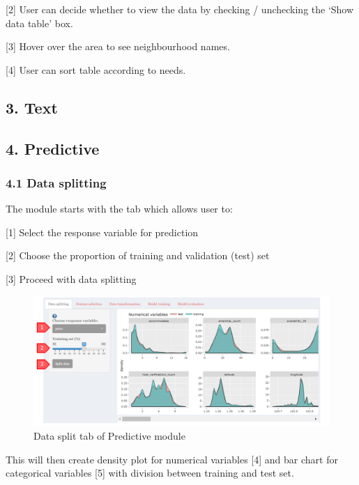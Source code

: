 \documentclass[
  12pt,
]{article}
\begin{document}
{[}2{]} User can decide whether to view the data by checking /
unchecking the `Show data table' box.

{[}3{]} Hover over the area to see neighbourhood names.

{[}4{]} User can sort table according to needs.

\hypertarget{text}{%
\subsection{3. Text}\label{text}}

\hypertarget{predictive}{%
\subsection{4. Predictive}\label{predictive}}

\hypertarget{data-splitting}{%
\subsubsection{4.1 Data splitting}\label{data-splitting}}

The module starts with the tab which allows user to:

{[}1{]} Select the response variable for prediction

{[}2{]} Choose the proportion of training and validation (test) set

{[}3{]} Proceed with data splitting

\begin{figure}[H]

{\centering \includegraphics[width=0.95\linewidth]{images/datasplit1} 

}

\caption{Data split tab of Predictive module}\label{fig:unnamed-chunk-10}
\end{figure}

This will then create density plot for numerical variables {[}4{]} and
bar chart for categorical variables {[}5{]} with division between
training and test set.
\end{document}
